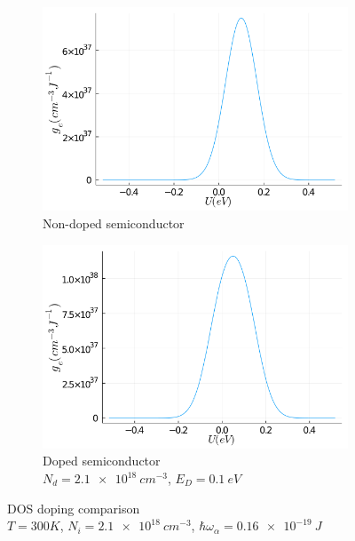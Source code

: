 \begin{figure}[htbp]
    \centering
    \begin{subfigure}[t]{0.49\textwidth}
        \includegraphics[width=\textwidth]{figures/3_elec/dos_undoped.png}
        \caption{Non-doped semiconductor}
    \end{subfigure}
    \begin{subfigure}[t]{0.49\textwidth}
        \includegraphics[width=\textwidth]{figures/3_elec/dos_doped.png}
        \caption{Doped semiconductor \\ $N_{d} = \SI{2.1e18}{cm^{-3}}$, $E_D = \SI{0.1}{eV}$}
    \end{subfigure}
    \caption[DOS]{DOS doping comparison \\ $T = 300K$, $N_{i} = \SI{2.1e18}{cm^{-3}}$, $\hbar \omega_\alpha = \SI{0.16e-19}{J}$}
    \label{fig:3_2}
\end{figure}

